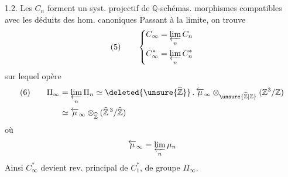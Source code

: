 1.2. Les $C_n$ forment un syst. projectif de $\mathbb Q$-schémas.
\diagram{\[
(4)\qquad\begin{tikzcd}[ampersand replacement=\&,column sep=large]
C_{n'}\arrow[r]\&C_n\\
(X^d,Y^d,\unsure{Z}^d)\&X,Y,Z\arrow[l]
\end{tikzcd}
\qquad\text{si }n\mid n'\quad\text{soit }n'=nd
\]}
morphismes compatibles avec les
déduits des hom. canoniques
Passant à la limite, on trouve
\[
(5)\qquad\left\{\begin{aligned}
C_\infty&=\varprojlim_n C_n\\
C_\infty^*&=\varprojlim_n C_n^*
\end{aligned}\right.
\]
sur lequel opère
\[
\begin{aligned}
(6)\qquad\Pi_\infty&=\varprojlim_n\Pi_n
\simeq\deleted{\unsure{\widehat{\mathbb Z}}}\, .\,\overleftarrow{\mu}_\infty
\otimes_{\unsure{\widehat{\mathbb Z}|\mathbb Z}}(\mathbb Z^3/\mathbb Z)\\
&\simeq\overleftarrow{\mu}_\infty\otimes_{\widehat{\mathbb Z}}
(\widehat{\mathbb Z}^{\,3}/\widehat{\mathbb Z})
\end{aligned}
\]
où
\[
\overleftarrow{\mu}_\infty=\varprojlim_n\mu_n
\]
Ainsi $C_\infty^*$ devient rev. principal de $C_1^*$, de groupe $\Pi_\infty$.
